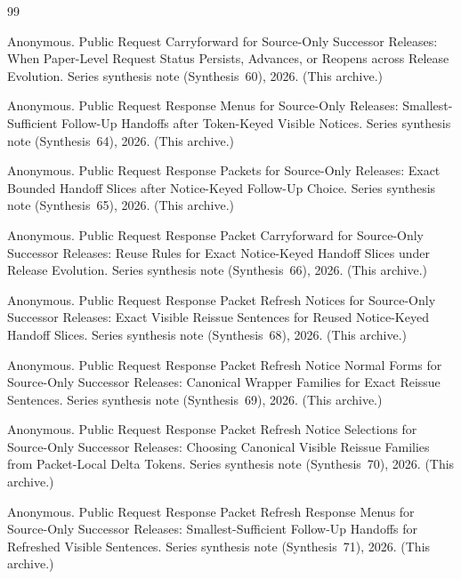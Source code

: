 \documentclass[11pt]{article}
\begin{document}
\begin{thebibliography}{99}\small

Anonymous.
\newblock Public Request Carryforward for Source-Only Successor Releases: When Paper-Level Request Status Persists, Advances, or Reopens across Release Evolution.
\newblock Series synthesis note (Synthesis~60), 2026. (This archive.)

Anonymous.
\newblock Public Request Response Menus for Source-Only Releases: Smallest-Sufficient Follow-Up Handoffs after Token-Keyed Visible Notices.
\newblock Series synthesis note (Synthesis~64), 2026. (This archive.)

Anonymous.
\newblock Public Request Response Packets for Source-Only Releases: Exact Bounded Handoff Slices after Notice-Keyed Follow-Up Choice.
\newblock Series synthesis note (Synthesis~65), 2026. (This archive.)

Anonymous.
\newblock Public Request Response Packet Carryforward for Source-Only Successor Releases: Reuse Rules for Exact Notice-Keyed Handoff Slices under Release Evolution.
\newblock Series synthesis note (Synthesis~66), 2026. (This archive.)

Anonymous.
\newblock Public Request Response Packet Refresh Notices for Source-Only Successor Releases: Exact Visible Reissue Sentences for Reused Notice-Keyed Handoff Slices.
\newblock Series synthesis note (Synthesis~68), 2026. (This archive.)

Anonymous.
\newblock Public Request Response Packet Refresh Notice Normal Forms for Source-Only Successor Releases: Canonical Wrapper Families for Exact Reissue Sentences.
\newblock Series synthesis note (Synthesis~69), 2026. (This archive.)

Anonymous.
\newblock Public Request Response Packet Refresh Notice Selections for Source-Only Successor Releases: Choosing Canonical Visible Reissue Families from Packet-Local Delta Tokens.
\newblock Series synthesis note (Synthesis~70), 2026. (This archive.)

Anonymous.
\newblock Public Request Response Packet Refresh Response Menus for Source-Only Successor Releases: Smallest-Sufficient Follow-Up Handoffs for Refreshed Visible Sentences.
\newblock Series synthesis note (Synthesis~71), 2026. (This archive.)


\end{thebibliography}
\end{document}

